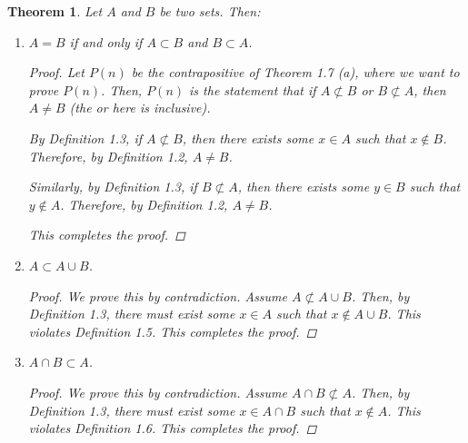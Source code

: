 \documentclass[11pt]{article}
\newtheorem{theorem}{Theorem}[section]
\theoremstyle{definition}
\numberwithin{equation}{subsection}
\begin{document}
\begin{theorem} \label{basicsets}
Let $A$ and $B$ be two sets.  Then:

\begin{enumerate}
\item[a)]
$A=B$ if and only if $A\subset B$ and $B\subset A$. 

\begin{proof}

Let $P(n)$ be the contrapositive of Theorem 1.7 (a), where we want to prove $P(n)$. Then, $P(n)$ is the statement that if $A \not \subset B$ or $B \not \subset A$, then $A \neq B$ (the or here is inclusive).

By Definition 1.3, if $A \not \subset B$, then there exists some $x \in A$ such that $x \notin B$. Therefore, by Definition 1.2, $A \neq B$.

Similarly, by Definition 1.3, if $B \not \subset A$, then there exists some $y \in B$ such that $y \notin A$. Therefore, by Definition 1.2, $A \neq B$.

This completes the proof.

\renewcommand\qedsymbol{QED}

\end{proof}

\item[b)]
$A\subset A\cup B$.

\begin{proof}

We prove this by contradiction. Assume $A \not \subset A \cup B$. Then, by Definition 1.3, there must exist some $x \in A$ such that $x \notin A \cup B$. This violates Definition 1.5. This completes the proof.

\renewcommand\qedsymbol{QED}

\end{proof}

\item[c)]
$A\cap B\subset A$.

\begin{proof}
We prove this by contradiction. Assume $A \cap B \not \subset A$. Then, by Definition 1.3, there must exist some $x \in A \cap B$ such that $x \notin A$. This violates Definition 1.6. This completes the proof.

\renewcommand\qedsymbol{QED}

\end{proof}

\end{enumerate}
\end{theorem}
\end{document}
